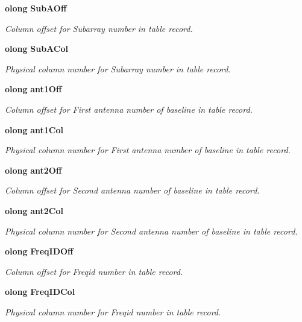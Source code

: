 \begin{CompactItemize}
{\bf olong} {\bf Sub\-AOff}
\begin{CompactList}\small\item\em Column offset for Subarray number in table record. \item\end{CompactList}\item 
{\bf olong} {\bf Sub\-ACol}
\begin{CompactList}\small\item\em Physical column number for Subarray number in table record. \item\end{CompactList}\item 
{\bf olong} {\bf ant1Off}
\begin{CompactList}\small\item\em Column offset for First antenna number of baseline in table record. \item\end{CompactList}\item 
{\bf olong} {\bf ant1Col}
\begin{CompactList}\small\item\em Physical column number for First antenna number of baseline in table record. \item\end{CompactList}\item 
{\bf olong} {\bf ant2Off}
\begin{CompactList}\small\item\em Column offset for Second antenna number of baseline in table record. \item\end{CompactList}\item 
{\bf olong} {\bf ant2Col}
\begin{CompactList}\small\item\em Physical column number for Second antenna number of baseline in table record. \item\end{CompactList}\item 
{\bf olong} {\bf Freq\-IDOff}
\begin{CompactList}\small\item\em Column offset for Freqid number in table record. \item\end{CompactList}\item 
{\bf olong} {\bf Freq\-IDCol}
\begin{CompactList}\small\item\em Physical column number for Freqid number in table record. \item\end{CompactList}\item 

\end{CompactItemize}
